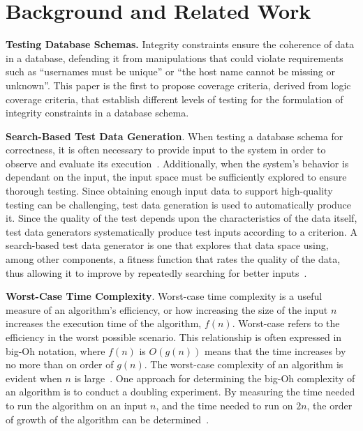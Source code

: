 
\section{Background and Related Work}




{\bf Testing Database Schemas.} Integrity constraints ensure the coherence of data in a database, defending it from
manipulations that could violate requirements such as “usernames must be unique” or “the host name cannot be missing or
unknown”. This paper is the first to propose coverage criteria, derived from logic coverage criteria, that establish
different levels of testing for the formulation of integrity constraints in a database schema.

{\bf Search-Based Test Data Generation}. When testing a database schema for correctness, it is often necessary to
provide input to the system in order to observe and evaluate its execution~\cite{ammann2008}. Additionally, when the
system's behavior is dependant on the input, the input space must be sufficiently explored to ensure thorough testing.
Since obtaining enough input data to support high-quality testing can be challenging, test data generation is used to
automatically produce it. Since the quality of the test depends upon the characteristics of the data itself, test data
generators systematically produce test inputs according to a criterion. A search-based test data generator is one that
explores that data space using, among other components, a fitness function that rates the quality of the data, thus
allowing it to improve by repeatedly searching for better inputs~\cite{mcminn2004a}.

{\bf Worst-Case Time Complexity}. Worst-case time complexity is a useful measure of an algorithm's efficiency, or how
increasing the size of the input $n$ increases the execution time of the algorithm, $f(n)$.  Worst-case refers to the
efficiency in the worst possible scenario.  This relationship is often expressed in big-Oh notation, where $f(n)$ is
$O(g(n))$ means that the time increases by no more than on order of $g(n)$. The worst-case complexity of an algorithm is
evident when $n$ is large~\cite{Goodrich2014}. One approach for determining the big-Oh complexity of an algorithm is to
conduct a doubling experiment. By measuring the time needed to run the algorithm on an input $n$, and the time needed to
run on $2n$, the order of growth of the algorithm can be determined~\cite{McGeoch2012,Sedgewick1998}.


